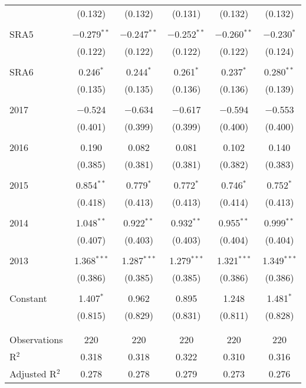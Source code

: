 \begin{table}[H]
\begin{adjustbox}{width=\textwidth, totalheight=\baselineskip}
\begin{tabular}{@{\extracolsep{5pt}}lccccc}
  & (0.132) & (0.132) & (0.131) & (0.132) & (0.132) \\ 
  & & & & & \\ 
 SRA5 & $-$0.279$^{**}$ & $-$0.247$^{**}$ & $-$0.252$^{**}$ & $-$0.260$^{**}$ & $-$0.230$^{*}$ \\ 
  & (0.122) & (0.122) & (0.122) & (0.122) & (0.124) \\ 
  & & & & & \\ 
 SRA6 & 0.246$^{*}$ & 0.244$^{*}$ & 0.261$^{*}$ & 0.237$^{*}$ & 0.280$^{**}$ \\ 
  & (0.135) & (0.135) & (0.136) & (0.136) & (0.139) \\ 
  & & & & & \\ 
 2017 & $-$0.524 & $-$0.634 & $-$0.617 & $-$0.594 & $-$0.553 \\ 
  & (0.401) & (0.399) & (0.399) & (0.400) & (0.400) \\ 
  & & & & & \\ 
 2016 & 0.190 & 0.082 & 0.081 & 0.102 & 0.140 \\ 
  & (0.385) & (0.381) & (0.381) & (0.382) & (0.383) \\ 
  & & & & & \\ 
 2015 & 0.854$^{**}$ & 0.779$^{*}$ & 0.772$^{*}$ & 0.746$^{*}$ & 0.752$^{*}$ \\ 
  & (0.418) & (0.413) & (0.413) & (0.414) & (0.413) \\ 
  & & & & & \\ 
 2014 & 1.048$^{**}$ & 0.922$^{**}$ & 0.932$^{**}$ & 0.955$^{**}$ & 0.999$^{**}$ \\ 
  & (0.407) & (0.403) & (0.403) & (0.404) & (0.404) \\ 
  & & & & & \\ 
 2013 & 1.368$^{***}$ & 1.287$^{***}$ & 1.279$^{***}$ & 1.321$^{***}$ & 1.349$^{***}$ \\ 
  & (0.386) & (0.385) & (0.385) & (0.386) & (0.386) \\ 
  & & & & & \\ 
 Constant & 1.407$^{*}$ & 0.962 & 0.895 & 1.248 & 1.481$^{*}$ \\ 
  & (0.815) & (0.829) & (0.831) & (0.811) & (0.828) \\ 
  & & & & & \\ 
\hline \\[-1.8ex] 
Observations & 220 & 220 & 220 & 220 & 220 \\ 
R$^{2}$ & 0.318 & 0.318 & 0.322 & 0.310 & 0.316 \\ 
Adjusted R$^{2}$ & 0.278 & 0.278 & 0.279 & 0.273 & 0.276 \\ 

\end{tabular}
\end{adjustbox}
\end{table}
